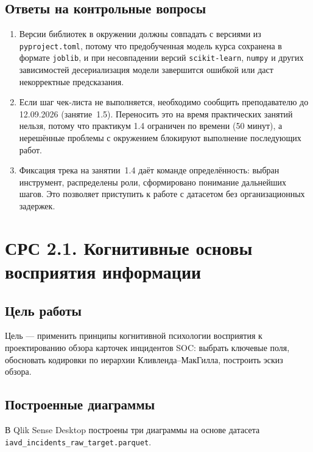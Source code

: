 \documentclass[12pt]{extreport}
\begin{document}
	\subsection{Ответы на контрольные вопросы}
	
	\begin{enumerate}[label=\arabic*.]
		\item Версии библиотек в окружении должны совпадать с версиями из \texttt{pyproject.toml}, потому что предобученная модель курса сохранена в формате \texttt{joblib}, и при несовпадении версий \texttt{scikit-learn}, \texttt{numpy} и других зависимостей десериализация модели завершится ошибкой или даст некорректные предсказания.
		\item Если шаг чек-листа не выполняется, необходимо сообщить преподавателю до 12.09.2026 (занятие~1.5). Переносить это на время практических занятий нельзя, потому что практикум 1.4 ограничен по времени (50 минут), а нерешённые проблемы с окружением блокируют выполнение последующих работ.
		\item Фиксация трека на занятии~1.4 даёт команде определённость: выбран инструмент, распределены роли, сформировано понимание дальнейших шагов. Это позволяет приступить к работе с датасетом без организационных задержек.
	\end{enumerate}
	
	\section{СРС 2.1. Когнитивные основы восприятия информации}
	
	\subsection{Цель работы}
	
	Цель --- применить принципы когнитивной психологии восприятия к проектированию обзора карточек инцидентов SOC: выбрать ключевые поля, обосновать кодировки по иерархии Кливленда--МакГилла, построить эскиз обзора.
	
	\subsection{Построенные диаграммы}
	
	В Qlik Sense Desktop построены три диаграммы на основе датасета \texttt{iavd\_incidents\_raw\_target.parquet}.
	
\end{document}
